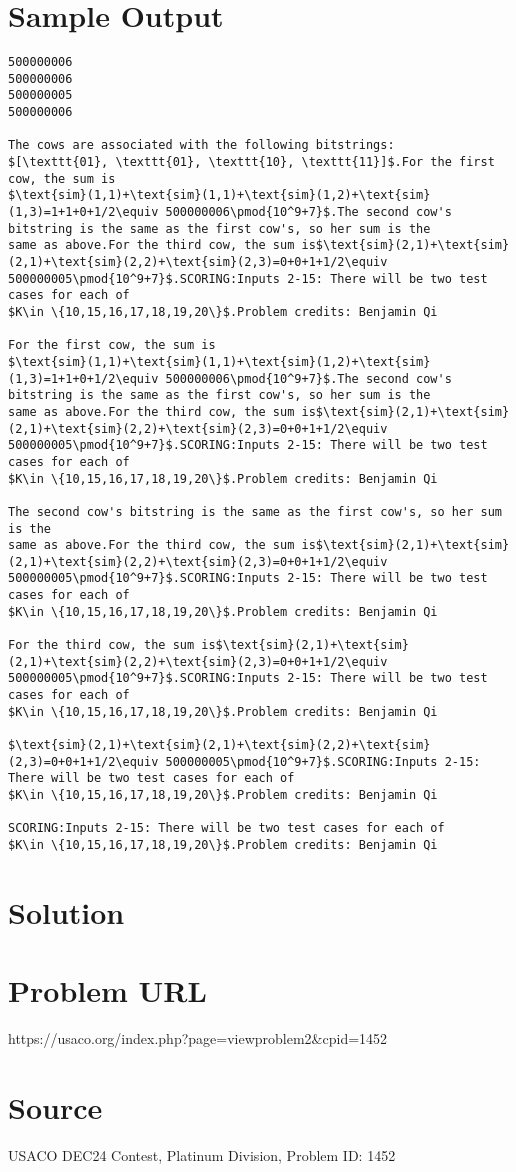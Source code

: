 \documentclass[12pt]{article}
\begin{document}
\section*{Sample Output}
\begin{verbatim}
500000006
500000006
500000005
500000006

The cows are associated with the following bitstrings:
$[\texttt{01}, \texttt{01}, \texttt{10}, \texttt{11}]$.For the first cow, the sum is
$\text{sim}(1,1)+\text{sim}(1,1)+\text{sim}(1,2)+\text{sim}(1,3)=1+1+0+1/2\equiv 500000006\pmod{10^9+7}$.The second cow's bitstring is the same as the first cow's, so her sum is the
same as above.For the third cow, the sum is$\text{sim}(2,1)+\text{sim}(2,1)+\text{sim}(2,2)+\text{sim}(2,3)=0+0+1+1/2\equiv 500000005\pmod{10^9+7}$.SCORING:Inputs 2-15: There will be two test cases for each of
$K\in \{10,15,16,17,18,19,20\}$.Problem credits: Benjamin Qi

For the first cow, the sum is
$\text{sim}(1,1)+\text{sim}(1,1)+\text{sim}(1,2)+\text{sim}(1,3)=1+1+0+1/2\equiv 500000006\pmod{10^9+7}$.The second cow's bitstring is the same as the first cow's, so her sum is the
same as above.For the third cow, the sum is$\text{sim}(2,1)+\text{sim}(2,1)+\text{sim}(2,2)+\text{sim}(2,3)=0+0+1+1/2\equiv 500000005\pmod{10^9+7}$.SCORING:Inputs 2-15: There will be two test cases for each of
$K\in \{10,15,16,17,18,19,20\}$.Problem credits: Benjamin Qi

The second cow's bitstring is the same as the first cow's, so her sum is the
same as above.For the third cow, the sum is$\text{sim}(2,1)+\text{sim}(2,1)+\text{sim}(2,2)+\text{sim}(2,3)=0+0+1+1/2\equiv 500000005\pmod{10^9+7}$.SCORING:Inputs 2-15: There will be two test cases for each of
$K\in \{10,15,16,17,18,19,20\}$.Problem credits: Benjamin Qi

For the third cow, the sum is$\text{sim}(2,1)+\text{sim}(2,1)+\text{sim}(2,2)+\text{sim}(2,3)=0+0+1+1/2\equiv 500000005\pmod{10^9+7}$.SCORING:Inputs 2-15: There will be two test cases for each of
$K\in \{10,15,16,17,18,19,20\}$.Problem credits: Benjamin Qi

$\text{sim}(2,1)+\text{sim}(2,1)+\text{sim}(2,2)+\text{sim}(2,3)=0+0+1+1/2\equiv 500000005\pmod{10^9+7}$.SCORING:Inputs 2-15: There will be two test cases for each of
$K\in \{10,15,16,17,18,19,20\}$.Problem credits: Benjamin Qi

SCORING:Inputs 2-15: There will be two test cases for each of
$K\in \{10,15,16,17,18,19,20\}$.Problem credits: Benjamin Qi
\end{verbatim}

\section*{Solution}


\section*{Problem URL}
https://usaco.org/index.php?page=viewproblem2&cpid=1452

\section*{Source}
USACO DEC24 Contest, Platinum Division, Problem ID: 1452
\end{document}
